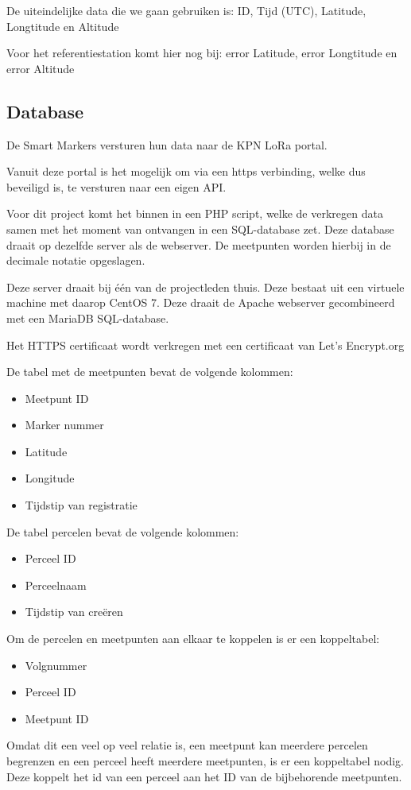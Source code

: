 De uiteindelijke data die we gaan gebruiken is:
ID, Tijd (UTC), Latitude, Longtitude en Altitude

Voor het referentiestation komt hier nog bij:
error Latitude, error Longtitude en error Altitude

\subsection{Database}
\label{sec:database}

De Smart Markers versturen hun data naar de KPN LoRa portal.

Vanuit deze portal is het mogelijk om via een https verbinding, welke dus beveiligd is,
te versturen naar een eigen API.

Voor dit project komt het binnen in een PHP script, welke de verkregen data samen met het
moment van ontvangen in een SQL-database zet. Deze database draait op dezelfde server als
de webserver. De meetpunten worden hierbij in de decimale notatie opgeslagen.

Deze server draait bij één van de projectleden thuis. Deze bestaat uit een virtuele
machine met daarop CentOS 7. Deze draait de Apache webserver gecombineerd met een
MariaDB SQL-database.

Het HTTPS certificaat wordt verkregen met een certificaat van Let's Encrypt.org

De tabel met de meetpunten bevat de volgende kolommen:
\begin{itemize}
    \item Meetpunt ID
    \item Marker nummer
    \item Latitude
    \item Longitude
    \item Tijdstip van registratie
\end{itemize}

De tabel percelen bevat de volgende kolommen:
\begin{itemize}
    \item Perceel ID
    \item Perceelnaam
    \item Tijdstip van creëren
\end{itemize}

Om de percelen en meetpunten aan elkaar te koppelen is er een koppeltabel:
\begin{itemize}
    \item Volgnummer
    \item Perceel ID
    \item Meetpunt ID
\end{itemize}

Omdat dit een veel op veel relatie is, een meetpunt kan meerdere percelen begrenzen en
een perceel heeft meerdere meetpunten, is er een koppeltabel nodig. Deze koppelt het id
van een perceel aan het ID van de bijbehorende meetpunten.
